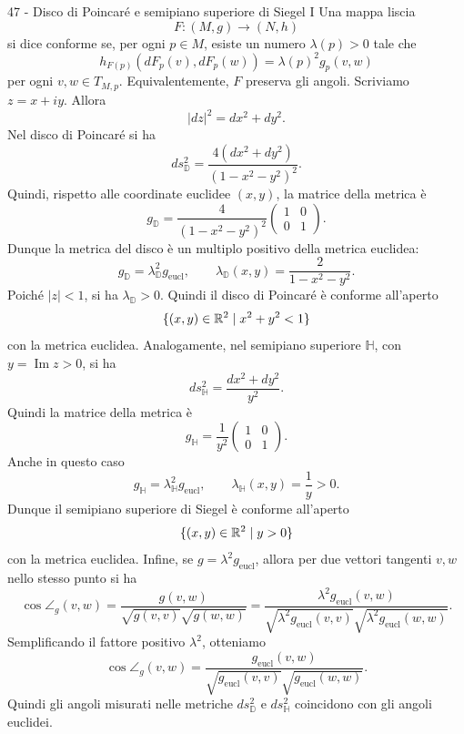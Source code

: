 \documentclass[a4paper]{article}
\begin{document}
\begin{snippetsolution}{47 - Disco di Poincaré e semipiano superiore di Siegel I}
    Una mappa liscia
    \[
        F\colon (M,g)\to(N,h)
    \]
    si dice conforme se, per ogni \(p\in M\), esiste un numero \(\lambda(p)>0\) tale che
    \[
        h_{F(p)}(dF_p(v),dF_p(w))=\lambda(p)^2g_p(v,w)
    \]
    per ogni \(v,w\in T_{M,p}\). Equivalentemente, \(F\) preserva gli angoli.
    Scriviamo \(z=x+iy\). Allora
    \[
        |dz|^2=dx^2+dy^2.
    \]
    Nel disco di Poincaré si ha
    \[
        ds^2_{\mathbb{D}}
        =
        \frac{4(dx^2+dy^2)}{(1-x^2-y^2)^2}.
    \]
    Quindi, rispetto alle coordinate euclidee \((x,y)\), la matrice della metrica è
    \[
        g_{\mathbb{D}}
        =
        \frac{4}{(1-x^2-y^2)^2}
        \begin{pmatrix}
            1 & 0\\
            0 & 1
        \end{pmatrix}.
    \]
    Dunque la metrica del disco è un multiplo positivo della metrica euclidea:
    \[
        g_{\mathbb{D}}=\lambda_{\mathbb{D}}^2g_{\mathrm{eucl}},
        \qquad
        \lambda_{\mathbb{D}}(x,y)=\frac{2}{1-x^2-y^2}.
    \]
    Poiché \(|z|<1\), si ha \(\lambda_{\mathbb{D}}>0\). Quindi il disco di Poincaré è conforme all'aperto
    \[
        \{(x,y)\in\mathbb{R}^2\mid x^2+y^2<1\}
    \]
    con la metrica euclidea.
    Analogamente, nel semipiano superiore \(\mathbb{H}\), con \(y=\operatorname{Im}z>0\), si ha
    \[
        ds^2_{\mathbb{H}}
        =
        \frac{dx^2+dy^2}{y^2}.
    \]
    Quindi la matrice della metrica è
    \[
        g_{\mathbb{H}}
        =
        \frac{1}{y^2}
        \begin{pmatrix}
            1 & 0\\
            0 & 1
        \end{pmatrix}.
    \]
    Anche in questo caso
    \[
        g_{\mathbb{H}}=\lambda_{\mathbb{H}}^2g_{\mathrm{eucl}},
        \qquad
        \lambda_{\mathbb{H}}(x,y)=\frac1y>0.
    \]
    Dunque il semipiano superiore di Siegel è conforme all'aperto
    \[
        \{(x,y)\in\mathbb{R}^2\mid y>0\}
    \]
    con la metrica euclidea.
    Infine, se \(g=\lambda^2g_{\mathrm{eucl}}\), allora per due vettori tangenti \(v,w\) nello stesso punto si ha
    \[
        \cos\angle_g(v,w)
        =
        \frac{g(v,w)}{\sqrt{g(v,v)}\sqrt{g(w,w)}}
        =
        \frac{\lambda^2g_{\mathrm{eucl}}(v,w)}
        {\sqrt{\lambda^2g_{\mathrm{eucl}}(v,v)}\sqrt{\lambda^2g_{\mathrm{eucl}}(w,w)}}.
    \]
    Semplificando il fattore positivo \(\lambda^2\), otteniamo
    \[
        \cos\angle_g(v,w)
        =
        \frac{g_{\mathrm{eucl}}(v,w)}
        {\sqrt{g_{\mathrm{eucl}}(v,v)}\sqrt{g_{\mathrm{eucl}}(w,w)}}.
    \]
    Quindi gli angoli misurati nelle metriche \(ds^2_{\mathbb{D}}\) e \(ds^2_{\mathbb{H}}\) coincidono con gli angoli euclidei.
\end{snippetsolution}
\end{document}
